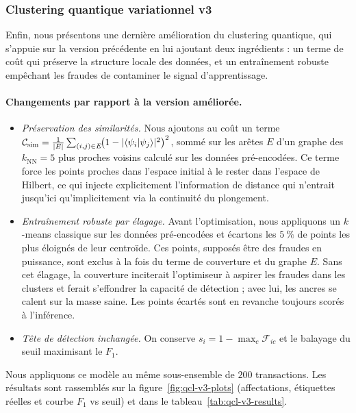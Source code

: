 \documentclass[a4paper]{article}
\begin{document}
\subsubsection*{Clustering quantique variationnel v3}

Enfin, nous présentons une dernière amélioration du clustering quantique, qui s'appuie sur la version précédente en lui ajoutant deux ingrédients : un terme de coût qui préserve la structure locale des données, et un entraînement robuste empêchant les fraudes de contaminer le signal d'apprentissage.

\paragraph{Changements par rapport à la version améliorée.}
\begin{itemize}
    \item \emph{Préservation des similarités.} Nous ajoutons au coût un terme $\mathcal{C}_{\text{sim}} = \frac{1}{|E|}\sum_{(i,j)\in E}\!\bigl(1 - |\!\braket{\psi_i|\psi_j}\!|^2\bigr)^2$, sommé sur les arêtes $E$ d'un graphe des $k_{\text{NN}} = 5$ plus proches voisins calculé sur les données pré-encodées. Ce terme force les points proches dans l'espace initial à le rester dans l'espace de Hilbert, ce qui injecte explicitement l'information de distance qui n'entrait jusqu'ici qu'implicitement via la continuité du plongement.
    \item \emph{Entraînement robuste par élagage.} Avant l'optimisation, nous appliquons un $k$-means classique sur les données pré-encodées et écartons les $5~\%$ de points les plus éloignés de leur centroïde. Ces points, supposés être des fraudes en puissance, sont exclus à la fois du terme de couverture et du graphe $E$. Sans cet élagage, la couverture inciterait l'optimiseur à aspirer les fraudes dans les clusters et ferait s'effondrer la capacité de détection ; avec lui, les ancres se calent sur la masse saine. Les points écartés sont en revanche toujours scorés à l'inférence.
    \item \emph{Tête de détection inchangée.} On conserve $s_i = 1 - \max_c \mathcal{F}_{ic}$ et le balayage du seuil maximisant le $F_1$.
\end{itemize}

Nous appliquons ce modèle au même sous-ensemble de $200$ transactions. Les résultats sont rassemblés sur la figure~\ref{fig:qcl-v3-plots} (affectations, étiquettes réelles et courbe $F_1$ vs seuil) et dans le tableau~\ref{tab:qcl-v3-results}.
\end{document}
